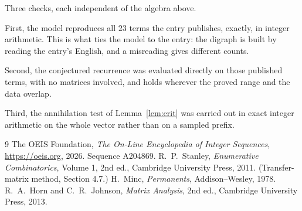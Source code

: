 \documentclass[11pt,a4paper]{article}
\theoremstyle{plain}
\theoremstyle{definition}
\begin{document}
Three checks, each independent of the algebra above.

First, the model reproduces all $23$ terms the entry publishes, exactly, in integer
arithmetic. This is what ties the model to the entry: the digraph is built by reading the
entry's English, and a misreading gives different counts.

Second, the conjectured recurrence was evaluated directly on those published terms, with no
matrices involved, and holds wherever the proved range and the data overlap.

Third, the annihilation test of Lemma~\ref{lem:crit} was carried out in exact integer
arithmetic on the whole vector rather than on a sampled prefix.

\begin{thebibliography}{9}
 The OEIS Foundation, \emph{The On-Line Encyclopedia of Integer
Sequences}, \url{https://oeis.org}, 2026. Sequence A204869.
 R.~P.~Stanley, \emph{Enumerative Combinatorics}, Volume 1, 2nd ed.,
Cambridge University Press, 2011. (Transfer-matrix method, Section 4.7.)
 H.~Minc, \emph{Permanents}, Addison--Wesley, 1978.
 R.~A.~Horn and C.~R.~Johnson, \emph{Matrix Analysis}, 2nd ed., Cambridge
University Press, 2013.
\end{thebibliography}
\end{document}
